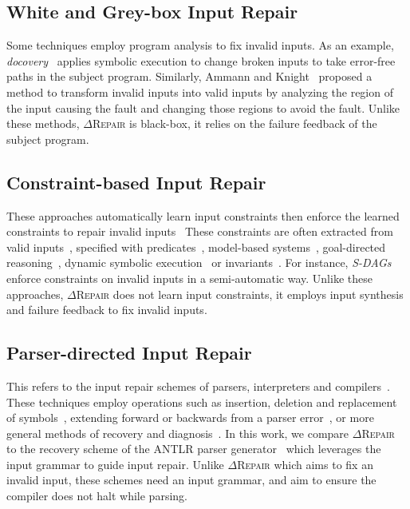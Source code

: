 \documentclass[acmsmall,screen,review,anonymous]{acmart}
\newcommand{\approach}{\textsc{$\Delta$Repair}\xspace}
\begin{document}
\subsection{White and Grey-box Input Repair} Some techniques employ program analysis to fix invalid inputs. As an example, \emph{docovery}~\cite{docovery:ase14} applies symbolic execution to change broken inputs to take error-free paths in the subject program. Similarly, Ammann and Knight~\cite{data_diversity} proposed a method to transform invalid inputs into valid inputs by analyzing the region of the input causing the fault and changing those regions to avoid the fault. Unlike these methods, \approach 
is black-box, it relies on the failure feedback of the subject program. 


\subsection{Constraint-based Input Repair} %
These approaches automatically learn input constraints then enforce the learned constraints to repair invalid inputs~\cite{hussain2010dynamic, Demsky:2006:IED:1146238.1146266} 
These constraints are often extracted from valid inputs~\cite{Long:2012:AIR:2337223.2337233, Rinard:2007:LCZ:1297027.1297072}, specified with predicates~\cite{elkarablieh2008juzi}, model-based systems~\cite{Demsky:2003:ADR:949343.949314}, goal-directed reasoning~\cite{1553560}, dynamic symbolic execution~\cite{hussain2010dynamic} or invariants~\cite{Demsky:2006:IED:1146238.1146266}. For instance, \emph{S-DAGs}~\cite{scheffczyk2004s} enforce constraints on invalid inputs in a semi-automatic way. Unlike these approaches, \approach does not learn input constraints, it employs input synthesis and failure feedback to fix invalid inputs. 


\subsection{Parser-directed Input Repair} %
This refers to the input repair schemes of parsers, interpreters and compilers~\cite{parr2011ll, diekmann2020dont, aho1972minimum, hammond1984survey, backhouse1979syntax}. 
These techniques employ operations such as insertion, deletion and replacement of symbols~\cite{anderson1981locally, cerecke2003locally, anderson1983assessment}, extending forward or backwards from a parser error~\cite{burke1982practical, mauney1982forward}, or more general methods of recovery and diagnosis~\cite{krawczyk1980error, aho1972minimum}. 
In this work, we compare \approach to the recovery scheme of the ANTLR parser generator~\cite{parr2011ll} which leverages the input grammar to guide input repair. %
Unlike \approach which aims to fix an invalid input, these schemes need an input grammar, and aim to ensure the compiler does not halt while parsing. 
\end{document}
